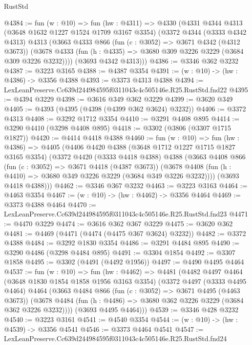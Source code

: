 \begin{lexlean}{RustStd}
\begin{coremodule}
@4384 := fun (w : @10) =>
  fun (hw : @4311) =>
  @4330
    (@4331
      @4344
      @4313
      (@3648 @1632 @1227 @1524 @1709 @3167 @3354)
      (@3372
        @4344
        (@3333 @4342 @4313)
        @4313
        (@3663
          @4333
          @866
          (fun (c : @3052) => @3671 @4342 (@4312 @3673))
          (@3678 @4333 (fun (h : @4335) => @3680 @309 @3226 @3229 (@3684 @309 @3226 @3232))))
        (@3693 @4342 @4313)))
@4386 := @3346 @362 @3232
@4387 := @3223 @3165
@4388 := @4387 @3354
@4391 := (w : @10) -> (hw : @4386) -> @3356 @4388
@4393 := @3373 @4313 @4388
@4394 := LexLeanPreserve.Cc639d244984595f0311043c4c505146e.R25.RustStd.fnd22
@4395 := @4394 @3229
@4398 := @3616 @349 @362 @3229
@4399 := @3620 @349
@4405 := @4393 (@4395 (@4398 (@4399 @362 @3624) @3232))
@4406 := @3372 @4313
@4408 := @3292 @1712 @3354
@4410 := @3291 @4408 @895
@4414 := @3290 @4410 (@3298 @4408 @895)
@4418 := @3302 (@3806 (@3307 @1715 @1827))
@4420 := @4414 @4418 @4388
@4460 := fun (w : @10) =>
  fun (hw : @4386) =>
  @4405
    (@4406
      @4420
      @4388
      (@3648 @1712 @1227 @1715 @1827 @3165 @3354)
      (@3372
        @4420
        (@3333 @4418 @4388)
        @4388
        (@3663
          @4408
          @866
          (fun (c : @3052) => @3671 @4418 (@4387 @3673))
          (@3678 @4408 (fun (h : @4410) => @3680 @349 @3226 @3229 (@3684 @349 @3226 @3232))))
        (@3693 @4418 @4388)))
@4462 := @3346 @367 @3232
@4463 := @3223 @3163
@4464 := @4463 @3354
@4467 := (w : @10) -> (hw : @4462) -> @3356 @4464
@4469 := @3373 @4388 @4464
@4470 := LexLeanPreserve.Cc639d244984595f0311043c4c505146e.R25.RustStd.fnd23
@4471 := @4470 @3229
@4474 := @3616 @362 @367 @3229
@4475 := @3620 @362
@4481 := @4469 (@4471 (@4474 (@4475 @367 @3624) @3232))
@4482 := @3372 @4388
@4484 := @3292 @1830 @3354
@4486 := @3291 @4484 @895
@4490 := @3290 @4486 (@3298 @4484 @895)
@4491 := @3304 @1854
@4492 := @3307 @1858
@4495 := @3302 (@4491 (@4492 @1956))
@4497 := @4490 @4495 @4464
@4537 := fun (w : @10) =>
  fun (hw : @4462) =>
  @4481
    (@4482
      @4497
      @4464
      (@3648 @1830 @1854 @1858 @1956 @3163 @3354)
      (@3372
        @4497
        (@3333 @4495 @4464)
        @4464
        (@3663
          @4484
          @866
          (fun (c : @3052) => @3671 @4495 (@4463 @3673))
          (@3678 @4484 (fun (h : @4486) => @3680 @362 @3226 @3229 (@3684 @362 @3226 @3232))))
        (@3693 @4495 @4464)))
@4539 := @3346 @428 @3232
@4540 := @3223 @3161
@4541 := @4540 @3354
@4544 := (w : @10) -> (hw : @4539) -> @3356 @4541
@4546 := @3373 @4464 @4541
@4547 := LexLeanPreserve.Cc639d244984595f0311043c4c505146e.R25.RustStd.fnd24

\end{coremodule}
\end{lexlean}
